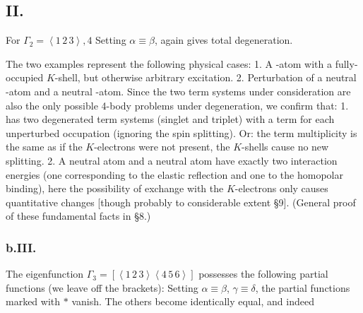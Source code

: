 \begin{paper}{1}
\subsection*{II.} For $\Gamma_2 = \left<1\,2\,3\right>, 4$
Setting $\alpha\equiv\beta$,
again gives total degeneration.

The two examples represent the following physical cases: 1. A -atom with a fully-occupied $K$-shell, but otherwise arbitrary excitation. 2. Perturbation of a neutral -atom and a neutral -atom. Since the two term systems under consideration are also the only possible 4-body problems under degeneration, we confirm that: 1.  has two degenerated term systems (singlet and triplet) with a term for each unperturbed occupation (ignoring the spin splitting). Or: the term multiplicity is the same as if the $K$-electrons were not present, the $K$-shells cause no new splitting. 2. A neutral  atom and a neutral  atom have exactly two interaction energies (one corresponding to the elastic reflection and one to the  homopolar binding), here the possibility of exchange with the $K$-electrons only causes quantitative changes [though probably to considerable extent \S9]. (General proof of these fundamental facts in \S8.)

\subsubsection*{b.III.} The eigenfunction $\Gamma_3=\left[\left<1\,2\,3\right>\left<4\,5\,6\right>\right]$ possesses the following partial functions (we leave off the brackets):
Setting $\alpha\equiv\beta$, $\gamma\equiv\delta$, the partial functions marked with $*$ vanish. The others become identically equal, and indeed


\end{paper}
